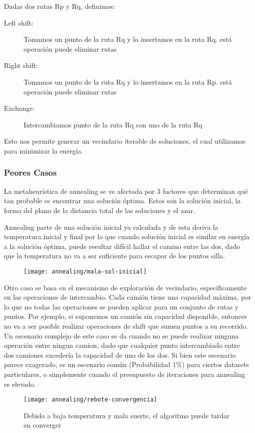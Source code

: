 Dadas dos rutas Rp y Rq, definimos:

\begin{description}
\item[Left shift:] Tomamos un punto de la ruta Rq y lo insertamos en la ruta Rq. está operación puede eliminar rutas

\item[Right shift:] Tomamos un punto de la ruta Rq y lo insertamos en la ruta Rp. está operación puede eliminar rutas

\item[Exchange:] Intercambiamos punto de la ruta Rq con uno de la ruta Rq
\end{description}

Esto nos permite generar un vecindario iterable de soluciones, el cual utilizamos para minimizar la energía.


\subsubsection{Peores Casos}

La metaheurística de annealing se ve afectada por 3 factores que determinan qué tan probable es encontrar una solución óptima. Estos son la solución inicial, la forma del plano de la distancia total de las soluciones y el azar.

Annealing parte de una solución inicial ya calculada y de esta deriva la temperatura inicial y final por lo que cuando solución inicial es similar en energía a la solución óptima, puede resultar difícil hallar el camino entre las dos, dado que la temperatura no va a ser suficiente para escapar de los puntos silla.

\begin{figure}[H]
\texttt{[image: annealing/mala-sol-inicial]}
\centering
\end{figure}

Otro caso se basa en el mecanismo de exploración de vecindario, específicamente en las operaciones de intercambio. Cada camión tiene una capacidad máxima, por lo que no todas las operaciones se pueden aplicar para un conjunto de rutas y puntos.
Por ejemplo, si suponemos un camión sin capacidad disponible, entonces no va a ser posible realizar operaciones de shift que sumen puntos a su recorrido.
Un escenario complejo de este caso se da cuando no se puede realizar ninguna operación entre ningun camion, dado que cualquier punto intercambiado entre dos camiones excedería la capacidad de uno de los dos.
Si bien este escenario parece exagerado, es un escenario común (Probabilidad 1\%) para ciertos datasets particulares, o simplemente cuando el presupuesto de iteraciones para annealing es elevado.

\begin{figure}[H]
\texttt{[image: annealing/rebote-convergencia]}
\centering
\caption{Debido a baja temperatura y mala suerte, el algoritmo puede tardar en converger}

\end{figure}



